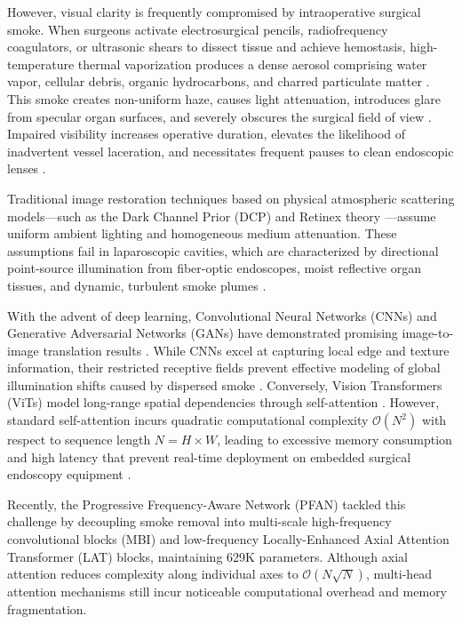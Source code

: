 \documentclass[conference]{IEEEtran}
\begin{document}
However, visual clarity is frequently compromised by intraoperative surgical smoke. When surgeons activate electrosurgical pencils, radiofrequency coagulators, or ultrasonic shears to dissect tissue and achieve hemostasis, high-temperature thermal vaporization produces a dense aerosol comprising water vapor, cellular debris, organic hydrocarbons, and charred particulate matter \cite{bolkar2018}. This smoke creates non-uniform haze, causes light attenuation, introduces glare from specular organ surfaces, and severely obscures the surgical field of view \cite{kotwal2016}. Impaired visibility increases operative duration, elevates the likelihood of inadvertent vessel laceration, and necessitates frequent pauses to clean endoscopic lenses \cite{armanious2020}.

Traditional image restoration techniques based on physical atmospheric scattering models---such as the Dark Channel Prior (DCP) \cite{he2011} and Retinex theory \cite{jobson1997}---assume uniform ambient lighting and homogeneous medium attenuation. These assumptions fail in laparoscopic cavities, which are characterized by directional point-source illumination from fiber-optic endoscopes, moist reflective organ tissues, and dynamic, turbulent smoke plumes \cite{chen2022}.

With the advent of deep learning, Convolutional Neural Networks (CNNs) and Generative Adversarial Networks (GANs) have demonstrated promising image-to-image translation results \cite{isola2017, zhu2017}. While CNNs excel at capturing local edge and texture information, their restricted receptive fields prevent effective modeling of global illumination shifts caused by dispersed smoke \cite{deng2019}. Conversely, Vision Transformers (ViTs) model long-range spatial dependencies through self-attention \cite{dosovitskiy2020}. However, standard self-attention incurs quadratic computational complexity $\mathcal{O}(N^2)$ with respect to sequence length $N = H \times W$, leading to excessive memory consumption and high latency that prevent real-time deployment on embedded surgical endoscopy equipment \cite{liu2021swin}.

Recently, the Progressive Frequency-Aware Network (PFAN) \cite{pfan2024} tackled this challenge by decoupling smoke removal into multi-scale high-frequency convolutional blocks (MBI) and low-frequency Locally-Enhanced Axial Attention Transformer (LAT) blocks, maintaining 629K parameters. Although axial attention reduces complexity along individual axes to $\mathcal{O}(N \sqrt{N})$, multi-head attention mechanisms still incur noticeable computational overhead and memory fragmentation.
\end{document}
